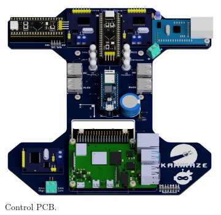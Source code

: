 \begin{figure}[h]
    \centering
    \begin{subfigure}{0.4\columnwidth}
      \includegraphics[width=\textwidth]{Sections/2Design Rationale/images/Control PCB.png}
      \caption{Control PCB.}
    \end{subfigure}
    \hfill
    \begin{subfigure}{0.15\columnwidth}

\end{subfigure}
\end{figure}

